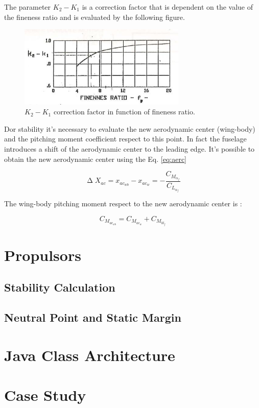 The parameter $K_2-K_1$ is a correction factor that is dependent on the value of the fineness ratio and is evaluated by the following figure.\cite{adas}


\begin{figure}[H]
\centering
\includegraphics[height=3.9cm]{Immagini/kdue}
\caption{$K_2-K_1$ correction factor in function of fineness ratio.}
\label{kfactor}
\end{figure}

Dor stability it's necessary to evaluate the new aerodynamic center (wing-body) and the pitching moment coefficient respect to this point. In fact the fuselage introduces a shift of the aerodynamic center to the leading edge. 
It's possible to obtain the new aerodynamic center using the Eq. \ref{eq:aerc}

\begin{equation}
\upDelta X_{ac} = x_{ac_{wb}} - x_{ac_{w}} = -\frac{C_{M_{\alpha_f}}}{C_{L_{\alpha_f}}}
\label{eq:aerc}
\end{equation}

The wing-body pitching moment respect to the new aerodynamic center is :

\begin{equation}
C_{M_{ac_{wb}}} = C_{M_{ac_{w}}}  + C_{M_{0l_f}}
\end{equation}


\section{Propulsors}

\subsection{Stability Calculation}
\subsection{Neutral Point and Static Margin}





\section{Java Class Architecture}
 
\section{Case Study}